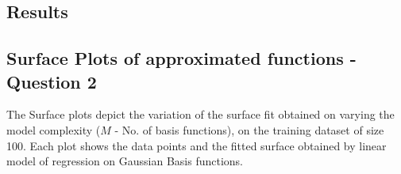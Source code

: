 \documentclass{article}
\begin{document}
\subsection{Results}


\subsection{Surface Plots of approximated functions - Question 2}
\begin{flushleft}
The Surface plots depict the variation of the surface fit obtained on varying the model complexity ($M$ - No. of basis functions), on the training dataset of size 100. Each plot shows the data points and the fitted surface obtained by linear model of regression on Gaussian Basis functions.

\end{flushleft}
\end{document}
